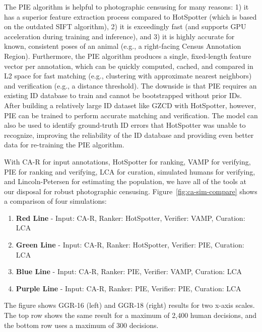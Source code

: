 The PIE algorithm is helpful to photographic censusing for many reasons: 1) it has a superior feature extraction process compared to HotSpotter (which is based on the outdated SIFT algorithm), 2) it is exceedingly fast (and supports GPU acceleration during training and inference), and 3) it is highly accurate for known, consistent poses of an animal (e.g., a right-facing Census Annotation Region).  Furthermore, the PIE algorithm produces a single, fixed-length feature vector per annotation, which can be quickly computed, cached, and compared in L2 space for fast matching (e.g., clustering with approximate nearest neighbors) and verification (e.g., a distance threshold).  The downside is that PIE requires an existing ID database to train and cannot be bootstrapped without prior IDs.  After building a relatively large ID dataset like GZCD with HotSpotter, however, PIE can be trained to perform accurate matching and verification.  The model can also be used to identify ground-truth ID errors that HotSpotter was unable to recognize, improving the reliability of the ID database and providing even better data for re-training the PIE algorithm.

With CA-R for input annotations, HotSpotter for ranking, VAMP for verifying, PIE for ranking and verifying, LCA for curation, simulated humans for verifying, and Lincoln-Petersen for estimating the population, we have all of the tools at our disposal for robust photographic censusing.  Figure~\ref{fig:ca-sim-compare} shows a comparison of four simulations:

\begin{enumerate}
    \item \textbf{Red Line} - Input: CA-R, Ranker: HotSpotter, Verifier: VAMP, Curation: LCA
    \item \textbf{Green Line} - Input: CA-R, Ranker: HotSpotter, Verifier: PIE, Curation: LCA
    \item \textbf{Blue Line} - Input: CA-R, Ranker: PIE, Verifier: VAMP, Curation: LCA
    \item \textbf{Purple Line} - Input: CA-R, Ranker: PIE, Verifier: PIE, Curation: LCA
\end{enumerate}

\noindent The figure shows GGR-16 (left) and GGR-18 (right) results for two x-axis scales.  The top row shows the same result for a maximum of 2,400 human decisions, and the bottom row uses a maximum of 300 decisions.

